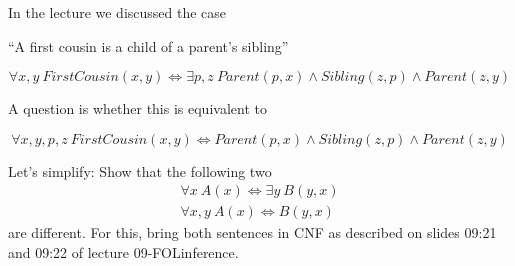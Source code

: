 



In the lecture we discussed the case

``A first cousin is a child of a parent's sibling''

$$\forall{x,y}~ FirstCousin(x,y) \iff 
\exists{p,z}~ Parent(p,x) \land Sibling(z,p) \land Parent(z,y)$$

A question is whether this is equivalent to

$$\forall{x,y,p,z}~ FirstCousin(x,y) \iff Parent(p,x) \land
  Sibling(z,p) \land Parent(z,y)$$

Let's simplify: Show that the following two
\begin{align}
\forall x~ A(x) \iff \exists y~ B(y,x) \\
\forall x,y~ A(x) \iff B(y,x)
\end{align}
are different. For this, bring both sentences in CNF as described on
slides 09:21 and 09:22 of lecture 09-FOLinference.



\exerfoot
